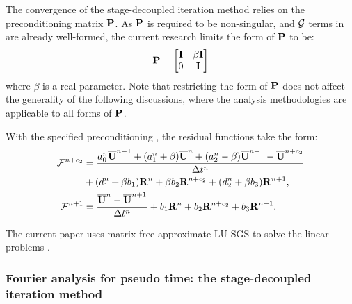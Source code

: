 \documentclass[preprint,12pt]{elsarticle}
\begin{document}
The convergence of the stage-decoupled iteration method relies on
the preconditioning matrix $\mathbf{P}$.
As $\mathbf{P}$ is required to be non-singular, and
$\mathcal{G}$ terms in  are already
well-formed, the current research limits the form
of $\mathbf{P}$ to be:
\begin{equation}
    \mathbf{P} = \begin{bmatrix}
        \mathbf{I} & \beta\mathbf{I} \\
        0    & \mathbf{I}
    \end{bmatrix}
    \label{eq:specialP}
\end{equation}
where $\beta$ is a real parameter.
Note that restricting the form of $\mathbf{P}$ does not affect the
generality of the following discussions, 
where the analysis methodologies
are applicable to all forms of $\mathbf{P}$.

With the specified preconditioning , 
the residual functions take the form:
\begin{equation}
    \begin{aligned}
        \mathcal{F}^{n+c_2} & = 
        \frac{a^n_0\overline{\mathbf{U}}^{n - 1} +
                (a^n_1+\beta)\overline{\mathbf{U}}^{n} +
                (a^n_2-\beta)\overline{\mathbf{U}}^{n + 1} - \overline{\mathbf{U}}^{n+c_2}}{\mathrm\Delta t^n}
            \\ & +
            (d^n_1 + \beta b_1)\mathbf{R}^{n} +
            \beta b_2 \mathbf{R}^{n+c_2} + 
            (d^n_2 + \beta b_3)\mathbf{R}^{n + 1}, \\
        \mathcal{F}^{n+1} & =    \frac{\overline{\mathbf{U}}^{n} - \overline{\mathbf{U}}^{n+1}}{\mathrm\Delta t^n}  +
            b_1 \mathbf{R}^n +
            b_2 \mathbf{R}^{n+c_2} +
            b_3 \mathbf{R}^{n+1}.
    \end{aligned}
\end{equation}

The current paper uses matrix-free approximate LU-SGS
\cite{luo1998fast,luo2001accurate} to solve the linear problems .

\subsubsection{Fourier analysis for pseudo time: the stage-decoupled iteration method}
\label{sssec:SDSFourier}
\end{document}
